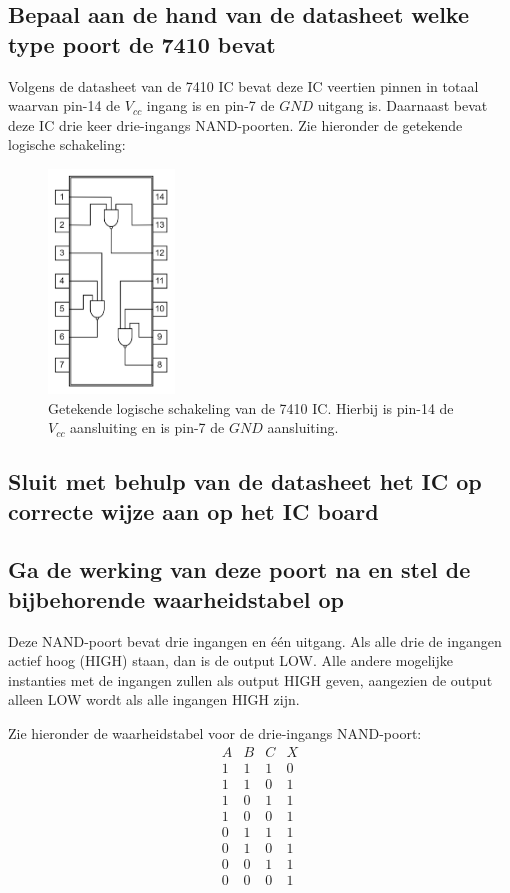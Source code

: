 \documentclass[12pt]{article}
\begin{document}
\subsection{Bepaal aan de hand van de datasheet welke type poort de 7410 bevat}
Volgens de datasheet van de 7410 IC bevat deze IC veertien pinnen in totaal waarvan pin-14 de $V_{cc}$ ingang is en pin-7 de $GND$ uitgang is. 
Daarnaast bevat deze IC drie keer drie-ingangs NAND-poorten. Zie hieronder de getekende logische schakeling:
\begin{figure}[h]
    \centering
    \includegraphics[width=0.3\textwidth]{7410_SCHEMA.png}
    \caption{Getekende logische schakeling van de 7410 IC. Hierbij is pin-14 de $V_{cc}$ aansluiting en is pin-7 de $GND$ aansluiting.}
    \label{fig:7410SCHEMA}
\end{figure}

\subsection{Sluit met behulp van de datasheet het IC op correcte wijze aan op het IC board}

\subsection{Ga de werking van deze poort na en stel de bijbehorende waarheidstabel op}
Deze NAND-poort bevat drie ingangen en één uitgang. Als alle drie de ingangen actief hoog (HIGH) staan, dan is de output LOW. 
Alle andere mogelijke instanties met de ingangen zullen als output HIGH geven, aangezien de output alleen LOW wordt als alle ingangen HIGH zijn. 

Zie hieronder de waarheidstabel voor de drie-ingangs NAND-poort:
\begin{displaymath}
    \begin{array}{|c|c|c||c|}
    A & B & C & X \\ %
    \hline %
    1 & 1 & 1 & 0 \\
    1 & 1 & 0 & 1 \\
    1 & 0 & 1 & 1 \\
    1 & 0 & 0 & 1 \\
    0 & 1 & 1 & 1 \\
    0 & 1 & 0 & 1 \\
    0 & 0 & 1 & 1 \\
    0 & 0 & 0 & 1
    \end{array}
    \end{displaymath}
\end{document}
